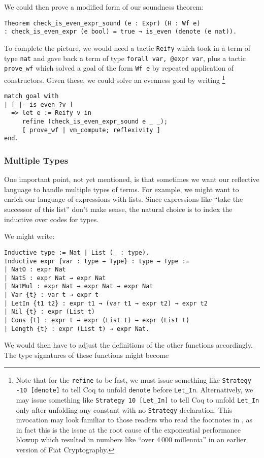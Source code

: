 We could then prove a modified form of our soundness theorem:
\begin{verbatim}
Theorem check_is_even_expr_sound (e : Expr) (H : Wf e)
: check_is_even_expr (e bool) = true → is_even (denote (e nat)).
\end{verbatim}

To complete the picture, we would need a tactic \texttt{Reify} which took in a term of type \texttt{nat} and gave back a term of type \texttt{forall var, @expr var}, plus a tactic \texttt{prove_wf} which solved a goal of the form \texttt{Wf e} by repeated application of constructors.
Given these, we could solve an evenness goal by writing%
\footnote{%
  Note that for the \texttt{refine} to be fast, we must issue something like \texttt{Strategy -10 [denote]} to tell Coq to unfold \texttt{denote} before \texttt{Let_In}.
  Alternatively, we may issue something like \texttt{Strategy 10 [Let_In]} to tell Coq to unfold \texttt{Let_In} only after unfolding any constant with no \texttt{Strategy} declaration.
  This invocation may look familiar to those readers who read the footnotes in , as in fact this is the issue at the root cause of the exponential performance blowup which resulted in numbers like ``over 4\,000 millennia'' in an earlier version of Fiat Cryptography.
}
\begin{verbatim}
match goal with
| [ |- is_even ?v ]
  => let e := Reify v in
     refine (check_is_even_expr_sound e _ _);
     [ prove_wf | vm_compute; reflexivity ]
end.
\end{verbatim}

\subsubsection{Multiple Types} \label{sec:multiple-types-ASTs}
One important point, not yet mentioned, is that sometimes we want our reflective language to handle multiple types of terms.
For example, we might want to enrich our language of expressions with lists.
Since expressions like ``take the successor of this list'' don't make sense, the natural choice is to index the inductive over codes for types.

We might write:
\begin{verbatim}
Inductive type := Nat | List (_ : type).
Inductive expr {var : type → Type} : type → Type :=
| NatO : expr Nat
| NatS : expr Nat → expr Nat
| NatMul : expr Nat → expr Nat → expr Nat
| Var {t} : var t → expr t
| LetIn {t1 t2} : expr t1 → (var t1 → expr t2) → expr t2
| Nil {t} : expr (List t)
| Cons {t} : expr t → expr (List t) → expr (List t)
| Length {t} : expr (List t) → expr Nat.
\end{verbatim}
We would then have to adjust the definitions of the other functions accordingly.
The type signatures of these functions might become

